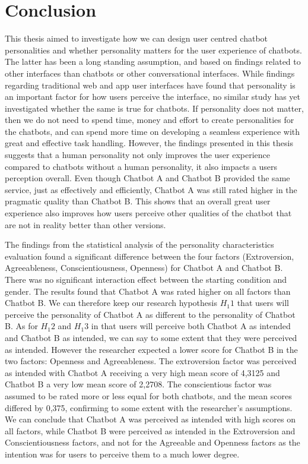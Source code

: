 \chapter{Conclusion}
\label{chap:conclusion}

This thesis aimed to investigate how we can design user centred chatbot personalities and whether personality matters for the user experience of chatbots. The latter has been a long standing assumption, and based on findings related to other interfaces than chatbots or other conversational interfaces. While findings regarding traditional web and app user interfaces have found that personality is an important factor for how users perceive the interface, no similar study has yet investigated whether the same is true for chatbots. If personality does not matter, then we do not need to spend time, money and effort to create personalities for the chatbots, and can spend more time on developing a seamless experience with great and effective task handling. However, the findings presented in this thesis suggests that a human personality not only improves the user experience compared to chatbots without a human personality, it also impacts a users perception overall. Even though Chatbot A and Chatbot B provided the same service, just as effectively and efficiently, Chatbot A was still rated higher in the pragmatic quality than Chatbot B. This shows that an overall great user experience also improves how users perceive other qualities of the chatbot that are not in reality better than other versions.

The findings from the statistical analysis of the personality characteristics evaluation found a significant difference between the four factors (Extroversion, Agreeableness, Conscientiousness, Openness) for Chatbot A and Chatbot B. There was no significant interaction effect between the starting condition and gender. The results found that Chatbot A was rated higher on all factors than Chatbot B. We can therefore keep our research hypothesis $H_1 1$ that users will perceive the personality of Chatbot A as different to the personality of Chatbot B. As for $H_1 2$ and $H_1 3$ in that users will perceive both Chatbot A as intended and Chatbot B as intended, we can say to some extent that they were perceived as intended. However the researcher expected a lower score for Chatbot B in the two factors: Openness and Agreeableness. The extroversion factor was perceived as intended with Chatbot A receiving a very high mean score of 4,3125 and Chatbot B a very low mean score of 2,2708. The conscientious factor was assumed to be rated more or less equal for both chatbots, and the mean scores differed by 0,375, confirming to some extent with the researcher's assumptions. We can conclude that Chatbot A was perceived as intended with high scores on all factors, while Chatbot B were perceived as intended in the Extroversion and Conscientiousness factors, and not for the Agreeable and Openness factors as the intention was for users to perceive them to a much lower degree. 

